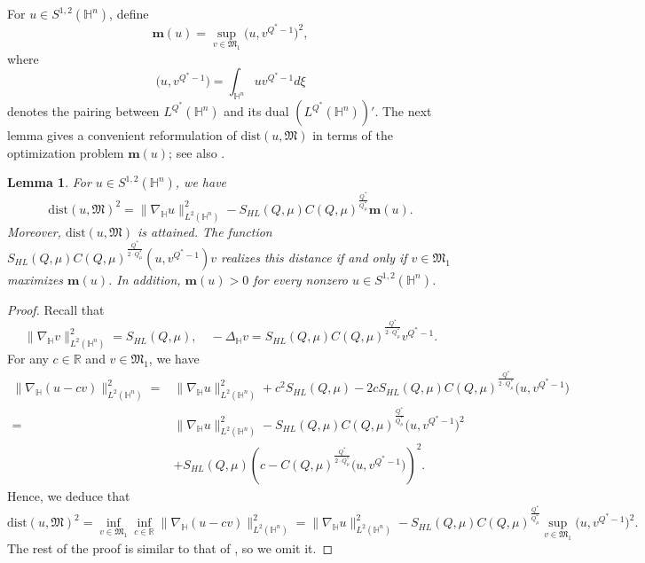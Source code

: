\documentclass[11pt]{article}
\newtheorem{lemma}{Lemma}[section]
\begin{document}
For $u\in S^{1,2}(\mathbb{H}^{n})$, define
\begin{equation*}
 \mathbf{m}(u)=\sup\limits_{v\in \mathfrak{M}_1}\Big(u,v^{Q^{\ast}-1}\Big)^2,
\end{equation*}
where
\begin{equation*}
 \Big(u,v^{Q^{\ast}-1}\Big)=\int_{\mathbb{H}^{n}} u v^{Q^{\ast}-1}d\xi
\end{equation*}
denotes the pairing between $L^{Q^{\ast}}(\mathbb{H}^{n})$ and its dual $(L^{Q^{\ast}}(\mathbb{H}^{n}))'$.
{The next lemma gives a convenient reformulation of $\mathrm{dist}(u,\mathfrak M)$ in terms of the optimization problem $\mathbf m(u)$; see also \cite[Lemma 2.2]{K25}.}
\begin{lemma}\label{l4.1}
{For $u\in S^{1,2}(\mathbb H^n)$, we have}
\begin{equation}\label{eq:l4.1}
 \mathrm{dist}(u,\mathfrak{M})^2=\|\nabla_\mathbb{H} u\|_{L^2(\mathbb{H}^n)}^2-S_{HL}(Q,\mu)C(Q,\mu)^{\frac{Q^{\ast}}{Q^{\ast}_{\mu}}}\mathbf{m}(u).
\end{equation}
{Moreover, $\mathrm{dist}(u,\mathfrak{M})$ is attained. The function
$S_{HL}(Q,\mu)C(Q,\mu)^{\frac{Q^{\ast}}{2\cdot Q^{\ast}_{\mu}}}(u,v^{Q^{\ast}-1})v
$
realizes this distance if and only if $v\in\mathfrak M_1$ maximizes $\mathbf m(u)$. In addition, $\mathbf m(u)>0$ for every nonzero $u\in S^{1,2}(\mathbb H^n)$.}
\end{lemma}
\begin{proof}
Recall that
\begin{equation*}
 \|\nabla_\mathbb{H}v\|_{{L}^{2}(\mathbb{H}^n)}^2=S_{HL}(Q,\mu),\quad -\Delta_{\mathbb{H}} v=S_{HL}(Q,\mu)C(Q,\mu)^{\frac{Q^{\ast}}{2\cdot Q^{\ast}_{\mu}}}v^{Q^{\ast}-1}.
\end{equation*}
For any $c\in \mathbb{R}$ and $v\in \mathfrak{M}_1$, we have
\begin{align*}
 \|\nabla_\mathbb{H} (u-cv)\|_{L^2(\mathbb{H}^n)}^2=&\|\nabla_\mathbb{H} u\|_{L^2(\mathbb{H}^n)}^2+
 c^2S_{HL}(Q,\mu)-2cS_{HL}(Q,\mu)C(Q,\mu)^{\frac{Q^{\ast}}{2\cdot Q^{\ast}_{\mu}}}\Big(u,v^{Q^{\ast}-1}\Big)\\
 =&\|\nabla_\mathbb{H} u\|_{L^2(\mathbb{H}^n)}^2-S_{HL}(Q,\mu)C(Q,\mu)^{\frac{Q^{\ast}}{ Q^{\ast}_{\mu}}}\Big(u,v^{Q^{\ast}-1}\Big)^2\\
 &+S_{HL}(Q,\mu)\left(c-C(Q,\mu)^{\frac{Q^{\ast}}{2\cdot Q^{\ast}_{\mu}}}\Big(u,v^{Q^{\ast}-1}\Big)\right)^2.
\end{align*}
Hence, we deduce that
\begin{equation*}
 \mathrm{dist}(u,\mathfrak{M})^2=\inf\limits_{v\in \mathfrak{M}_1}\inf\limits_{c\in \mathbb{R}}
 \|\nabla_\mathbb{H} (u-cv)\|_{L^2(\mathbb{H}^n)}^2=
 \|\nabla_\mathbb{H} u\|_{L^2(\mathbb{H}^n)}^2-S_{HL}(Q,\mu)C(Q,\mu)^{\frac{Q^{\ast}}{Q^{\ast}_{\mu}}}\sup\limits_{v\in \mathfrak{M}_1}\Big(u,v^{Q^{\ast}-1}\Big)^2.
\end{equation*}
The rest of the proof is similar to that of \cite[Lemma 2.2]{K25}, so we omit it.
\end{proof}
\end{document}
